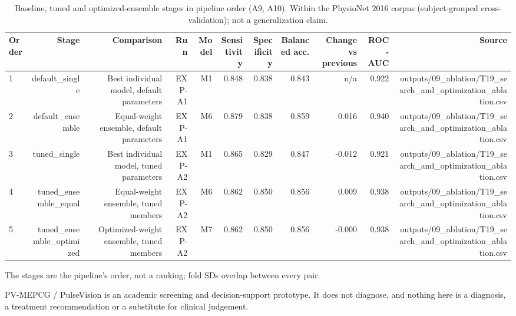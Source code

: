 \begin{table}[htbp]
  \centering
  \caption{Baseline, tuned and optimized-ensemble stages in pipeline order (A9, A10). Within the PhysioNet 2016 corpus (subject-grouped cross-validation); not a generalization claim.}
  \label{tab:q1_t06}
  \begin{tabular}{lrrrrrrrrrr}
    \toprule
    Order & Stage & Comparison & Run & Model & Sensitivity & Specificity & Balanced acc. & Change vs previous & ROC-AUC & Source \\
    \midrule
    1 & default\_single & Best individual model, default parameters & EXP-A1 & M1 & 0.848 & 0.838 & 0.843 & n/a & 0.922 & outputs/09\_ablation/T19\_search\_and\_optimization\_ablation.csv \\
    2 & default\_ensemble & Equal-weight ensemble, default parameters & EXP-A1 & M6 & 0.879 & 0.838 & 0.859 & 0.016 & 0.940 & outputs/09\_ablation/T19\_search\_and\_optimization\_ablation.csv \\
    3 & tuned\_single & Best individual model, tuned parameters & EXP-A2 & M1 & 0.865 & 0.829 & 0.847 & -0.012 & 0.921 & outputs/09\_ablation/T19\_search\_and\_optimization\_ablation.csv \\
    4 & tuned\_ensemble\_equal & Equal-weight ensemble, tuned members & EXP-A2 & M6 & 0.862 & 0.850 & 0.856 & 0.009 & 0.938 & outputs/09\_ablation/T19\_search\_and\_optimization\_ablation.csv \\
    5 & tuned\_ensemble\_optimized & Optimized-weight ensemble, tuned members & EXP-A2 & M7 & 0.862 & 0.850 & 0.856 & -0.000 & 0.938 & outputs/09\_ablation/T19\_search\_and\_optimization\_ablation.csv \\
    \bottomrule
  \end{tabular}
  \par\footnotesize The stages are the pipeline's order, not a ranking; fold SDs overlap between every pair.
  \par\footnotesize PV-MEPCG / PulseVision is an academic screening and decision-support prototype. It does not diagnose, and nothing here is a diagnosis, a treatment recommendation or a substitute for clinical judgement.
\end{table}
